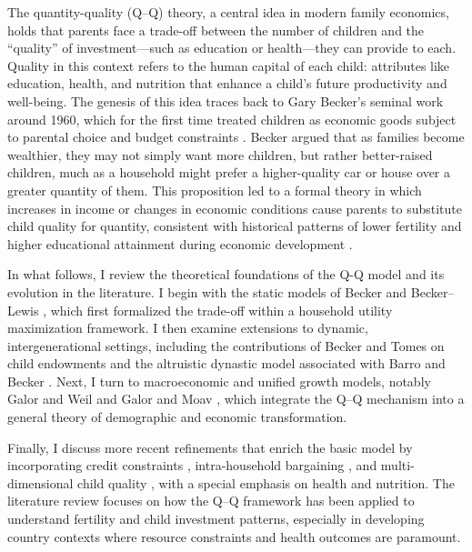 \documentclass[]{AEA}
\begin{document}
The quantity-quality (Q--Q) theory, a central idea in modern family
economics, holds that parents face a trade-off between the number of
children and the ``quality'' of investment---such as education or
health---they can provide to each. Quality in this context refers to the
human capital of each child: attributes like education, health, and
nutrition that enhance a child's future productivity and well-being. The
genesis of this idea traces back to Gary Becker's seminal work around
1960, which for the first time treated children as economic goods
subject to parental choice and budget constraints
\citep{becker1960economic}. Becker argued that as families become
wealthier, they may not simply want more children, but rather
better-raised children, much as a household might prefer a
higher-quality car or house over a greater quantity of them. This
proposition led to a formal theory in which increases in income or
changes in economic conditions cause parents to substitute child quality
for quantity, consistent with historical patterns of lower fertility and
higher educational attainment during economic development
\citep{galor2000population}.

In what follows, I review the theoretical foundations of the Q-Q model
and its evolution in the literature. I begin with the static models of
Becker \citep{becker1960economic} and Becker--Lewis
\citep{becker1973interaction}, which first formalized the trade-off
within a household utility maximization framework. I then examine
extensions to dynamic, intergenerational settings, including the
contributions of Becker and Tomes \citep{becker1976child} on child
endowments and the altruistic dynastic model associated with Barro and
Becker \citep{barro1989fertility}. Next, I turn to macroeconomic and
unified growth models, notably Galor and Weil
\citep{galor2000population} and Galor and Moav \citep{galor2002natural},
which integrate the Q--Q mechanism into a general theory of demographic
and economic transformation.

Finally, I discuss more recent refinements that enrich the basic model
by incorporating credit constraints \citep{doepke2004accounting},
intra-household bargaining \citep{doepke2019bargaining}, and
multi-dimensional child quality
\citep{hoddinott2013economic, kalemli2002does}, with a special emphasis
on health and nutrition. The literature review focuses on how the Q--Q
framework has been applied to understand fertility and child investment
patterns, especially in developing country contexts where resource
constraints and health outcomes are paramount.
\end{document}
